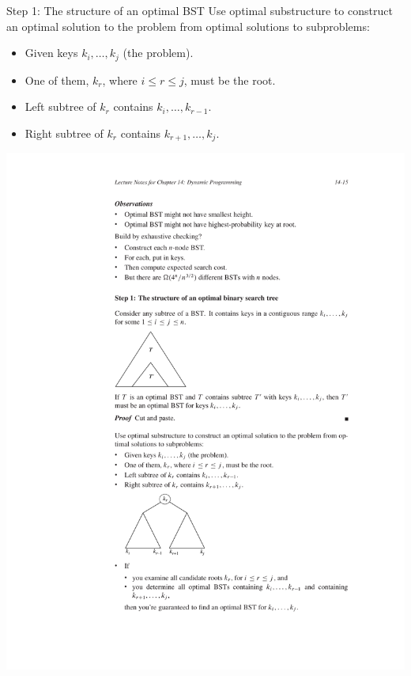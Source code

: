 \documentclass[aspectratio=169]{beamer}
\begin{document}
\begin{frame}{Step 1: The structure of an optimal BST}
    Use optimal substructure to construct an optimal solution to the problem from optimal solutions to subproblems:
    \begin{itemize}
        \item Given keys $k_i, \ldots, k_j$ (the problem).
        \item One of them, $k_r$, where $i \leq r \leq j$, must be the root.
        \item Left subtree of $k_r$ contains $k_i, \ldots, k_{r-1}$.
        \item Right subtree of $k_r$ contains $k_{r+1}, \dots, k_j$.
    \end{itemize}
    \includegraphics[width=\textwidth, trim={4cm 6cm 4cm 18.25cm}, clip]{figures/BST_step1}
\end{frame}
\end{document}
